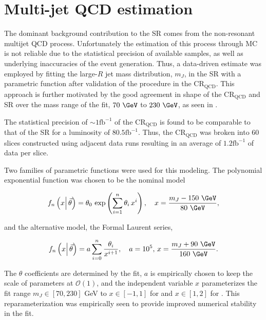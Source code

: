\section{Multi-jet QCD estimation} \label{sec:background:qcd}

The dominant background contribution to the SR comes from the non-resonant
multijet QCD process. Unfortunately the estimation of this process through MC
is not reliable due to the statistical precision of available samples, as well
as underlying inaccuracies of the event generation.  Thus, a data-driven
estimate was employed by fitting the large-$R$ jet mass distribution, $m_{J}$,
in the SR with a parametric function after validation of the procedure in the
$\text{CR}_{\text{QCD}}$.  This approach is further motivated by the good
agreement in shape of the $\text{CR}_{\text{QCD}}$ and SR over the mass range
of the fit, $70~\GeV$ to $230~\GeV$, as seen in .

The statistical precision of $\sim 1 \text{fb}^{-1}$ of the
$\text{CR}_{\text{QCD}}$ is found to be comparable to that of the SR for a
luminosity of $80.5 \text{fb}^{-1}$.  Thus, the $\text{CR}_{\text{QCD}}$ was
broken into 60 slices constructed using adjacent data runs resulting in an
average of $1.2 \text{fb}^{-1}$ of data per slice.

Two families of parametric functions were used for this modeling.  The
polynomial exponential function was chosen to be the nominal model

\begin{equation}
\label{sec:background:polynomial}
f_{n} \left(x \middle|\,\vec{\theta}\right) = \theta_{0}\, \exp\left(\sum_{i=1}^{n} \theta_{i}\,x^{i}\right), \quad x = \frac{m_{J} - 150~\GeV}{80~\GeV},
\end{equation}

and the alternative model, the Formal Laurent series,

\begin{equation}
\label{sec:background:laurent}
f_{n} \left(x \middle|\,\vec{\theta}\right) = a \sum_{i=0}^{n} \frac{\theta_{i}}{x^{i+1}}, \quad a=10^{5},\,x = \frac{m_{J} + 90~\GeV}{160~\GeV}.
\end{equation}

The $\theta$ coefficients are determined by the fit, $a$ is empirically chosen
to keep the scale of parameters at $\mathcal{O}(1)$, and the independent
variable $x$ parameterizes the fit range $m_{J}\in[70,230]$ GeV to $x\in[-1,1]$
for  and $x\in[1,2]$ for
.  This reparameterization was empirically seen to
provide improved numerical stability in the fit.


